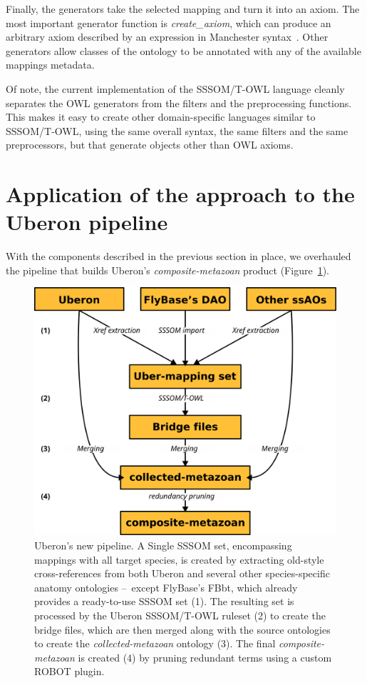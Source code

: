 \documentclass{ceurart}
\def\function#1{\textit{#1}}
\begin{document}
Finally, the generators take the selected mapping and turn it into an
axiom.  The most important generator function is
\function{create\_axiom}, which can produce an arbitrary axiom described
by an expression in Manchester syntax~\cite{patel-schneider2012}. Other
generators allow classes of the ontology to be annotated with any of the
available mappings metadata.

Of note, the current implementation of the SSSOM/T-OWL language cleanly
separates the OWL generators from the filters and the preprocessing
functions.  This makes it easy to create other domain-specific languages
similar to SSSOM/T-OWL, using the same overall syntax, the same filters
and the same preprocessors, but that generate objects other than OWL
axioms.

\section{Application of the approach to the Uberon pipeline}

With the components described in the previous section in place, we
overhauled the pipeline that builds Uberon's \emph{composite-metazoan}
product (Figure~\ref{fig:pipeline}).

\begin{figure}
  \centering
  \includegraphics[width=.4\linewidth]{figs/pipeline}
  \caption{Uberon's new pipeline. A Single SSSOM set, encompassing
  mappings with all target species, is created by extracting
  old-style cross-references from both Uberon and several other
  species-specific anatomy ontologies --~except FlyBase's FBbt, which
  already provides a ready-to-use SSSOM set (1). The resulting set is
  processed by the Uberon SSSOM/T-OWL ruleset (2) to create the bridge
  files, which are then merged along with the source ontologies to
  create the \emph{collected-metazoan} ontology (3). The final
  \emph{composite-metazoan} is created (4) by pruning redundant terms
  using a custom ROBOT plugin.}
  \label{fig:pipeline}
\end{figure}
\end{document}
